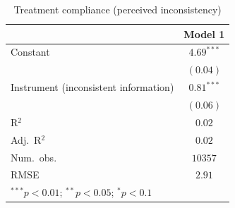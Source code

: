 
\begin{table}
\begin{center}
\begin{tabular}{l c}
\hline
 & Model 1 \\
\hline
Constant                              & $4.69^{***}$ \\
                                      & $(0.04)$     \\
Instrument (inconsistent information) & $0.81^{***}$ \\
                                      & $(0.06)$     \\
\hline
R$^2$                                 & $0.02$       \\
Adj.\ R$^2$                           & $0.02$       \\
Num.\ obs.                            & $10357$      \\
RMSE                                  & $2.91$       \\
\hline
\multicolumn{2}{l}{\scriptsize{$^{***}p<0.01$; $^{**}p<0.05$; $^{*}p<0.1$}}
\end{tabular}
\caption{Treatment compliance (perceived inconsistency)}
\label{TreatmentCompliance}
\end{center}
\end{table}

